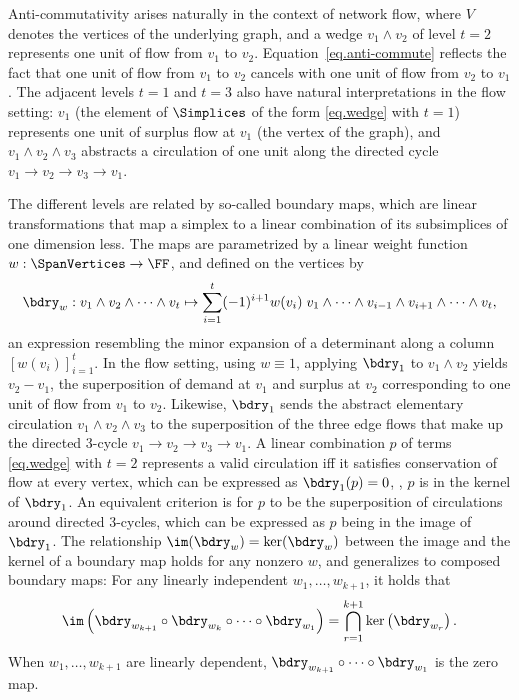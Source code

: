 Anti-commutativity arises naturally in the context of network flow,
where $V$ denotes the vertices of the underlying graph,
and a wedge $v_1 \wedge v_2$  of level $t=2$ represents one unit of flow from
$v_1$ to $v_2$.
Equation~\eqref{eq.anti-commute} reflects the fact that one unit of flow
from $v_1$ to $v_2$ cancels with one unit of flow from $v_2$ to $v_1$.
The adjacent levels $t=1$ and $t=3$ also have natural interpretations in the
flow setting:
$v_1$ (the element of $\Simplices$ of the form \eqref{eq.wedge} with $t=1$) represents
one unit of surplus flow at $v_1$ (the vertex of the graph),
and $v_1 \wedge v_2 \wedge v_3$ abstracts a circulation of one
unit along the directed cycle $v_1 \to v_2 \to v_3 \to v_1$.

The different levels are related by so-called boundary maps, which are linear transformations that map a simplex to a linear
combination of its subsimplices of one dimension less.
The maps are parametrized by a linear weight function $w: \SpanVertices \to \FF$,
and defined on the vertices by
\begin{equation}\label{eq.boundary}
  \bdry_w:
  v_1 \wedge v_2 \wedge \dots \wedge v_t
  \mapsto
  \sum_{i=1}^t
    (-1)^{i+1}
    w(v_i) \;
    v_1 \wedge \dots \wedge v_{i-1} \wedge v_{i+1} \wedge \dots \wedge v_t,
\end{equation}
an expression resembling the minor expansion of a determinant along a column
$[ w(v_i) ]_{i=1}^t$.
In the flow setting,
using $w \equiv 1$,
applying \(\bdry_1\) to \(v_1 \wedge v_2\)
yields $v_2 - v_1$, the superposition of demand at $v_1$
and surplus at $v_2$ corresponding to one unit of flow from $v_1$ to $v_2$.
Likewise, $\bdry_1$ sends the abstract elementary circulation
\(v_1 \wedge v_2 \wedge v_3\) to the superposition of the three edge flows
that make up the directed 3-cycle $v_1\to v_2 \to v_3 \to v_1$. 
A linear combination $p$ of terms \eqref{eq.wedge} with $t=2$ represents a
valid circulation iff it satisfies conservation of flow at every vertex,
which can be expressed as $\bdry_1(p)=0$,
\ie, $p$ is in the kernel of $\bdry_1$.
An equivalent criterion is for $p$ to be the superposition of
circulations around directed 3-cycles,
which can be expressed as $p$ being in the image of $\bdry_1$.
The relationship $\im(\bdry_w) = \ker(\bdry_w)$ between the image and the kernel of a boundary map holds for any nonzero $w$, and generalizes to composed boundary maps:
For any linearly independent \(w_1, \ldots, w_{k+1}\), it holds that
\begin{equation}\label{eq.image.kernel}
  \im\left(
    \bdry_{w_{k+1}} \circ \bdry_{w_{k} }\circ \dots \circ \bdry_{w_1}
  \right)
  =
  \bigcap_{r=1}^{k+1} \ker\left( \bdry_{w_r} \right).
\end{equation}
When \(w_1, \ldots, w_{k+1}\) are linearly dependent, \(\bdry_{w_{k+1}} \circ \dots \circ \bdry_{w_1}\) is the zero map.

